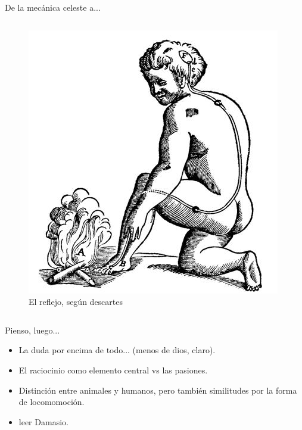 \documentclass{beamer}
\begin{document}
\begin{frame}{De la mecánica celeste a...}
\begin{columns}
    \begin{column}{0.5\textwidth}
        \begin{figure}
            \centering
            \includegraphics[width=1\linewidth]{descartes-reflejo.jpg}
            \caption{El reflejo, según descartes}
            \label{fig:my_label}
        \end{figure}
    \end{column}
    \end{columns}
\end{frame}

\begin{frame}{Pienso, luego...}
\transfade
    \begin{itemize}
        \item La duda por encima de todo... (menos de dios, claro).
        \pause
        \item El raciocinio como elemento central vs las pasiones.
        \pause
        \item Distinción entre animales y humanos, pero también similitudes por la forma de locomomoción.
        \pause
        \item leer Damasio.
    \end{itemize}
\end{frame}
\end{document}
